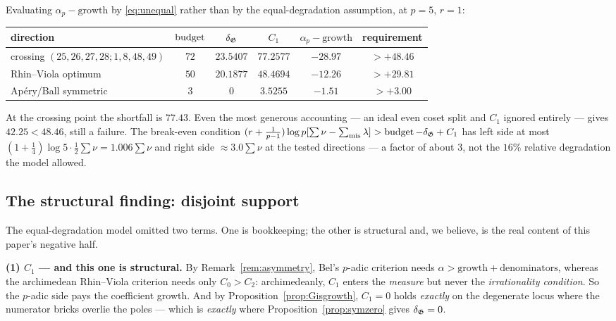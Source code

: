 \begin{finding}\label{find:gatefail}
 Evaluating
$\alpha_p-\mathrm{growth}$ by \eqref{eq:unequal} rather than by the equal-degradation
assumption, at $p=5$, $r=1$:
\begin{center}
\tabsmall
\begin{tabular}{lccccc}
\toprule
direction & $\operatorname{budget}$ & $\delta_{\mathfrak{G}}$ & $C_1$ & $\alpha_p-\mathrm{growth}$ & requirement\\
\midrule
crossing $(25,26,27,28;1,8,48,49)$ & $72$ & $23.5407$ & $77.2577$ & $-28.97$ & $>+48.46$\\
Rhin--Viola optimum & $50$ & $20.1877$ & $48.4694$ & $-12.26$ & $>+29.81$\\
Ap\'ery/Ball symmetric & $3$ & $0$ & $3.5255$ & $-1.51$ & $>+3.00$\\
\bottomrule
\end{tabular}
\end{center}
At the crossing point the shortfall is $77.43$. Even the most generous accounting --- an
ideal even coset split and $C_1$ ignored entirely --- gives $42.25<48.46$, still a failure.
The break-even condition $(r+\tfrac1{p-1})\log p[\sum\nu-\sum_{\mathrm{mis}}\lambda]>
\operatorname{budget}-\delta_{\mathfrak{G}}+C_1$ has left side at most $(1+\tfrac14)\log5\cdot\tfrac12\sum\nu=1.006\sum\nu$
and right side $\approx3.0\sum\nu$ at the tested directions --- a factor of about $3$, not
the $16\%$ relative degradation the model allowed.
\end{finding}

\subsection{The structural finding: disjoint support}\label{ss:tension}

The equal-degradation model omitted two terms. One is bookkeeping; the other is structural
and, we believe, is the real content of this paper's negative half.

\smallskip\noindent\textbf{(1) $C_1$ --- and this one is structural.} By
Remark~\ref{rem:asymmetry}, Bel's $p$-adic criterion needs
$\alpha>\mathrm{growth}+\mathrm{denominators}$, whereas the archimedean Rhin--Viola criterion
needs only $C_0>C_2$: archimedeanly, $C_1$ enters the \emph{measure} but never the
\emph{irrationality condition}. So the $p$-adic side pays the coefficient growth. And by
Proposition~\ref{prop:Gisgrowth}, $C_1=0$ holds \emph{exactly} on the degenerate locus where
the numerator bricks overlie the poles --- which is \emph{exactly} where
Proposition~\ref{prop:symzero} gives $\delta_{\mathfrak{G}}=0$.

